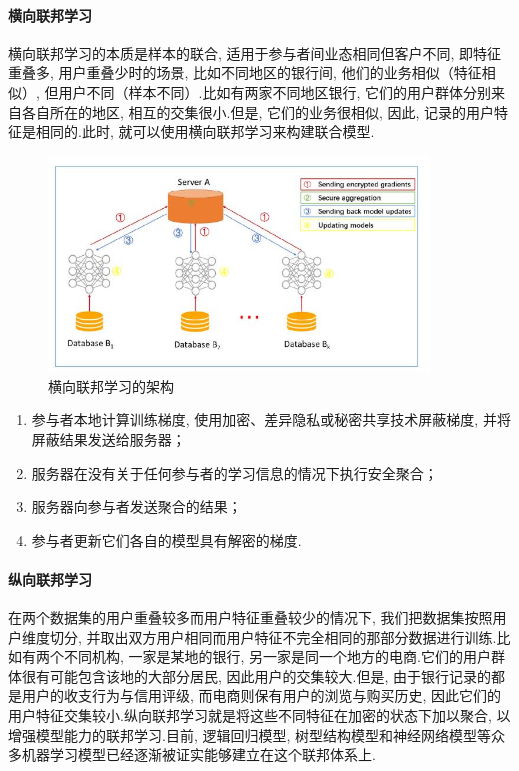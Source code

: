 \documentclass[a4paper]{article}
\theoremstyle{definition}
\numberwithin{equation}{section}
\begin{document}
\paragraph{横向联邦学习}  横向联邦学习的本质是样本的联合, 适用于参与者间业态相同但客户不同, 即特征重叠多, 用户重叠少时的场景, 比如不同地区的银行间, 他们的业务相似（特征相似）, 但用户不同（样本不同）.比如有两家不同地区银行, 它们的用户群体分别来自各自所在的地区, 相互的交集很小.但是, 它们的业务很相似, 因此, 记录的用户特征是相同的.此时,  就可以使用横向联邦学习来构建联合模型. 
 
\begin{figure}
    \centering
    \label{Architecture for horizontal FL}
    \includegraphics[width=0.9\textwidth]{Architecture_for_horizontal_FL_system.jpg}
    \caption{横向联邦学习的架构}
\end{figure}

\begin{enumerate}
\item 参与者本地计算训练梯度, 使用加密\citep{aono2017privacy}、差异隐私\citep{shokri2015privacy}或秘密共享技术屏蔽梯度\citep{bonawitz2017practical}, 并将屏蔽结果发送给服务器；
\item 服务器在没有关于任何参与者的学习信息的情况下执行安全聚合；
\item 服务器向参与者发送聚合的结果；
\item 参与者更新它们各自的模型具有解密的梯度.
\end{enumerate}

\paragraph{纵向联邦学习}
在两个数据集的用户重叠较多而用户特征重叠较少的情况下, 我们把数据集按照用户维度切分, 并取出双方用户相同而用户特征不完全相同的那部分数据进行训练.比如有两个不同机构, 一家是某地的银行, 另一家是同一个地方的电商.它们的用户群体很有可能包含该地的大部分居民, 因此用户的交集较大.但是, 由于银行记录的都是用户的收支行为与信用评级, 而电商则保有用户的浏览与购买历史, 因此它们的用户特征交集较小.纵向联邦学习就是将这些不同特征在加密的状态下加以聚合, 以增强模型能力的联邦学习.目前, 逻辑回归模型, 树型结构模型和神经网络模型等众多机器学习模型已经逐渐被证实能够建立在这个联邦体系上.
\end{document}
